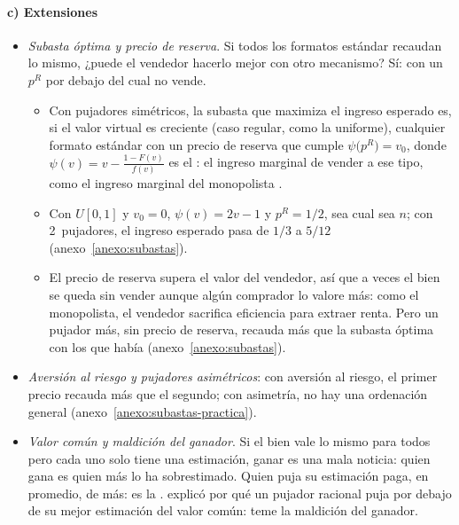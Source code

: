 \documentclass[11pt]{article}
\begin{document}
\paragraph{c) Extensiones}

\begin{itemize}
\item \emph{Subasta óptima y precio de reserva}\nocite{Myerson1981Optimal,RileySamuelson1981Optimal}. Si todos los formatos estándar recaudan lo mismo, ¿puede el vendedor hacerlo mejor con otro mecanismo? Sí: con un  $p^R$ por debajo del cual no vende.
  \begin{itemize}
  \item Con pujadores simétricos, la subasta que maximiza el ingreso esperado es, si el valor virtual es creciente (caso regular, como la uniforme), cualquier formato estándar con un precio de reserva que cumple $\psi\big(p^R\big)=v_0$, donde $\psi(v)=v-\frac{1-F(v)}{f(v)}$ es el : el ingreso marginal de vender a ese tipo, como el ingreso marginal del monopolista .
  \item Con $U[0,1]$ y $v_0=0$, $\psi(v)=2v-1$ y $p^R=1/2$, sea cual sea $n$; con 2~pujadores, el ingreso esperado pasa de $1/3$ a $5/12$ (anexo~\ref{anexo:subastas}).
  \item El precio de reserva supera el valor del vendedor, así que a veces el bien se queda sin vender aunque algún comprador lo valore más: como el monopolista, el vendedor sacrifica eficiencia para extraer renta. Pero un pujador más, sin precio de reserva, recauda más que la subasta óptima con los que había\nocite{BulowKlemperer1996Auctions} (anexo~\ref{anexo:subastas}).
  \end{itemize}
\item \emph{Aversión al riesgo y pujadores asimétricos}: con aversión al riesgo, el primer precio recauda más que el segundo; con asimetría, no hay una ordenación general (anexo~\ref{anexo:subastas-practica}).
\item \emph{Valor común y maldición del ganador}. Si el bien vale lo mismo para todos pero cada uno solo tiene una estimación, ganar es una mala noticia: quien gana es quien más lo ha sobrestimado. Quien puja su estimación paga, en promedio, de más: es la . \textcites{Wilson1969Competitive}{Wilson1977Bidding} explicó por qué un pujador racional puja por debajo de su mejor estimación del valor común: teme la maldición del ganador\nocite{Nobel2020PressRelease}.
  \begin{itemize}

\end{itemize}
\end{itemize}
\end{document}
